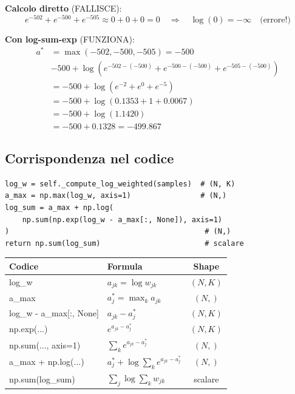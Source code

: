 \documentclass[11pt,a4paper]{article}
\begin{document}
\textbf{Calcolo diretto} (FALLISCE):
\[
  e^{-502} + e^{-500} + e^{-505} \approx 0 + 0 + 0 = 0
  \quad\Rightarrow\quad \log(0) = -\infty \quad\text{(errore!)}
\]

\textbf{Con log-sum-exp} (FUNZIONA):
\begin{align*}
  a^* &= \max(-502, -500, -505) = -500 \\
  &-500 + \log\!\left(e^{-502-(-500)} + e^{-500-(-500)}
  + e^{-505-(-500)}\right) \\
  &= -500 + \log\!\left(e^{-2} + e^{0} + e^{-5}\right) \\
  &= -500 + \log\!\left(0.1353 + 1 + 0.0067\right) \\
  &= -500 + \log(1.1420) \\
  &= -500 + 0.1328 = -499.867
\end{align*}

\subsection{Corrispondenza nel codice}

\begin{lstlisting}[caption={Log-sum-exp in log\_likelihood}]
log_w = self._compute_log_weighted(samples)  # (N, K)
a_max = np.max(log_w, axis=1)                # (N,)
log_sum = a_max + np.log(
    np.sum(np.exp(log_w - a_max[:, None]), axis=1)
)                                             # (N,)
return np.sum(log_sum)                        # scalare
\end{lstlisting}

\begin{center}
\renewcommand{\arraystretch}{1.3}
\begin{tabular}{>{\ttfamily\small}l l c}
\toprule
\textbf{Codice} & \textbf{Formula} & \textbf{Shape} \\
\midrule
log\_w & $a_{jk} = \log w_{jk}$ & $(N,K)$ \\
a\_max & $a_j^* = \max_k a_{jk}$ & $(N,)$ \\
log\_w - a\_max[:, None] & $a_{jk} - a_j^*$ & $(N,K)$ \\
np.exp(...) & $e^{a_{jk} - a_j^*}$ & $(N,K)$ \\
np.sum(..., axis=1) & $\sum_k e^{a_{jk} - a_j^*}$ & $(N,)$ \\
a\_max + np.log(...) & $a_j^* + \log\sum_k e^{a_{jk}-a_j^*}$ & $(N,)$ \\
np.sum(log\_sum) & $\sum_j \log\sum_k w_{jk}$ & scalare \\
\bottomrule
\end{tabular}
\end{center}
\end{document}
